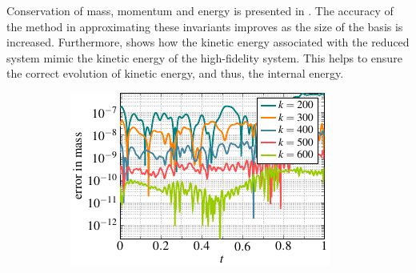 Conservation of mass, momentum and energy is presented in . The accuracy of the method in approximating these invariants improves as the size of the basis is increased. Furthermore,  shows how the kinetic energy associated with the reduced system mimic the kinetic energy of the high-fidelity system. This helps to ensure the correct evolution of kinetic energy, and thus, the internal energy.
 
\begin{figure}
  \centering
  \begin{subfigure}[]{0.48\linewidth}
            \includegraphics[scale=1]{Figures/paper-figure5.pdf}

\end{subfigure}
\end{figure}
